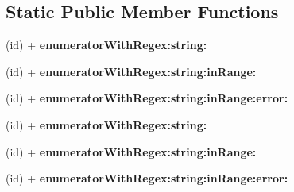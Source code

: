 \subsection*{Static Public Member Functions}
\begin{DoxyCompactItemize}
\item 
\hypertarget{interface_r_k_enumerator_a68e613dc4d7b465896311f90242d9ec0}{(id) + {\bfseries enumerator\-With\-Regex\-:string\-:}}\label{interface_r_k_enumerator_a68e613dc4d7b465896311f90242d9ec0}

\item 
\hypertarget{interface_r_k_enumerator_a42ca094bc7747676b568ff967140e8cb}{(id) + {\bfseries enumerator\-With\-Regex\-:string\-:in\-Range\-:}}\label{interface_r_k_enumerator_a42ca094bc7747676b568ff967140e8cb}

\item 
\hypertarget{interface_r_k_enumerator_a19eb1be48091d8d15d97dff122c64a17}{(id) + {\bfseries enumerator\-With\-Regex\-:string\-:in\-Range\-:error\-:}}\label{interface_r_k_enumerator_a19eb1be48091d8d15d97dff122c64a17}

\item 
\hypertarget{interface_r_k_enumerator_a68e613dc4d7b465896311f90242d9ec0}{(id) + {\bfseries enumerator\-With\-Regex\-:string\-:}}\label{interface_r_k_enumerator_a68e613dc4d7b465896311f90242d9ec0}

\item 
\hypertarget{interface_r_k_enumerator_a42ca094bc7747676b568ff967140e8cb}{(id) + {\bfseries enumerator\-With\-Regex\-:string\-:in\-Range\-:}}\label{interface_r_k_enumerator_a42ca094bc7747676b568ff967140e8cb}

\item 
\hypertarget{interface_r_k_enumerator_a19eb1be48091d8d15d97dff122c64a17}{(id) + {\bfseries enumerator\-With\-Regex\-:string\-:in\-Range\-:error\-:}}\label{interface_r_k_enumerator_a19eb1be48091d8d15d97dff122c64a17}

\end{DoxyCompactItemize}
